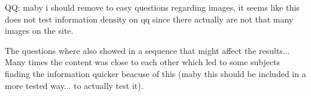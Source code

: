 QQ: maby i should remove to easy questions regarding images, it seems like this does not test information density on qq since there actually are not that many images on the site.

The questions where also showed in a sequence that might affect the results... Many times the content was close to each other which led to some subjects finding the information quicker beacuse of this (maby this should be included in a more tested way... to actually test it).

